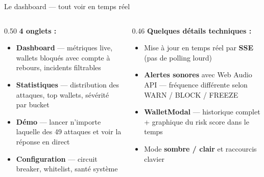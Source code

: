 \documentclass[aspectratio=169,12pt]{beamer}
\newenvironment{tightitemize}{%
  \setlength{\topsep}{1pt}\setlength{\partopsep}{0pt}%
  \begin{itemize}\setlength{\itemsep}{1pt}\setlength{\parskip}{0pt}}{\end{itemize}}
\begin{document}
\begin{frame}{Le dashboard --- tout voir en temps réel}
  \begin{columns}[T]
    \begin{column}{0.50\textwidth}
      \textbf{4 onglets :}\\[0.15cm]
      \begin{tightitemize}
        \item \textbf{Dashboard} --- métriques live, wallets bloqués avec compte à rebours, incidents filtrables
        \item \textbf{Statistiques} --- distribution des attaques, top wallets, sévérité par bucket
        \item \textbf{Démo} --- lancer n'importe laquelle des 49 attaques et voir la réponse en direct
        \item \textbf{Configuration} --- circuit breaker, whitelist, santé système
      \end{tightitemize}
    \end{column}
    \begin{column}{0.46\textwidth}
      \textbf{Quelques détails techniques :}\\[0.15cm]
      \begin{tightitemize}
        \item Mise à jour en temps réel par \textbf{SSE} (pas de polling lourd)
        \item \textbf{Alertes sonores} avec Web Audio API --- fréquence différente selon WARN / BLOCK / FREEZE
        \item \textbf{WalletModal} --- historique complet + graphique du risk score dans le temps
        \item Mode \textbf{sombre / clair} et raccourcis clavier
      \end{tightitemize}
    \end{column}
  \end{columns}
\end{frame}
\end{document}
